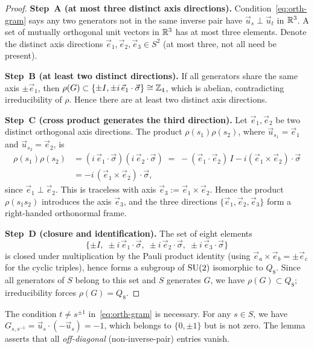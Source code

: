  \begin{proof}
    \textbf{Step~A (at most three distinct axis directions).}
    Condition~\eqref{eq:orth-gram} says any two generators not in the same inverse pair
    have $\vec{u}_s \perp \vec{u}_t$ in $\mathbb{R}^3$.
    A set of mutually orthogonal unit vectors in $\mathbb{R}^3$ has at most three elements.
    Denote the distinct axis directions $\vec{e}_1, \vec{e}_2, \vec{e}_3 \in S^2$
    (at most three, not all need be present).

    \textbf{Step~B (at least two distinct directions).}
    If all generators share the same axis $\pm\vec{e}_1$, then
    $\rho(G) \subset \{\pm I, \pm i\,\vec{e}_1 \cdot \vec{\sigma}\} \cong \mathbb{Z}_4$,
    which is abelian, contradicting irreducibility of $\rho$.
    Hence there are at least two distinct axis directions.

    \textbf{Step~C (cross product generates the third direction).}
    Let $\vec{e}_1, \vec{e}_2$ be two distinct orthogonal axis directions.
    The product $\rho(s_1)\rho(s_2)$, where $\vec{u}_{s_1} = \vec{e}_1$
    and $\vec{u}_{s_2} = \vec{e}_2$, is
    \begin{align*}
      \rho(s_1)\rho(s_2)
      &= (i\,\vec{e}_1 \cdot \vec{\sigma})(i\,\vec{e}_2 \cdot \vec{\sigma})
      \;=\; -(\vec{e}_1 \cdot \vec{e}_2)\,I - i(\vec{e}_1 \times \vec{e}_2) \cdot \vec{\sigma} \\
      &= -i\,(\vec{e}_1 \times \vec{e}_2) \cdot \vec{\sigma},
    \end{align*}
    since $\vec{e}_1 \perp \vec{e}_2$.
    This is traceless with axis $\vec{e}_3 := \vec{e}_1 \times \vec{e}_2$.
    Hence the product $\rho(s_1 s_2)$ introduces the axis $\vec{e}_3$,
    and the three directions $\{\vec{e}_1, \vec{e}_2, \vec{e}_3\}$ form a right-handed
    orthonormal frame.

    \textbf{Step~D (closure and identification).}
    The set of eight elements
    \[
      \{\pm I,\;
      \pm i\,\vec{e}_1 \cdot \vec{\sigma},\;
      \pm i\,\vec{e}_2 \cdot \vec{\sigma},\;
      \pm i\,\vec{e}_3 \cdot \vec{\sigma}\}
    \]
    is closed under multiplication by the Pauli product identity
    (using $\vec{e}_a \times \vec{e}_b = \pm\vec{e}_c$ for the cyclic triples),
    hence forms a subgroup of $\mathrm{SU}(2)$ isomorphic to $Q_8$.
    Since all generators of $S$ belong to this set and $S$ generates $G$,
    we have $\rho(G) \subset Q_8$; irreducibility forces $\rho(G) = Q_8$.
  \end{proof}

  \begin{remark}
    The condition $t \neq s^{\pm 1}$ in~\eqref{eq:orth-gram} is necessary.
    For any $s \in S$, we have $G_{s,s^{-1}} = \vec{u}_s \cdot (-\vec{u}_s) = -1$,
    which belongs to $\{0, \pm 1\}$ but is not zero.
    The lemma asserts that all \emph{off-diagonal} (non-inverse-pair) entries vanish.
  \end{remark}
